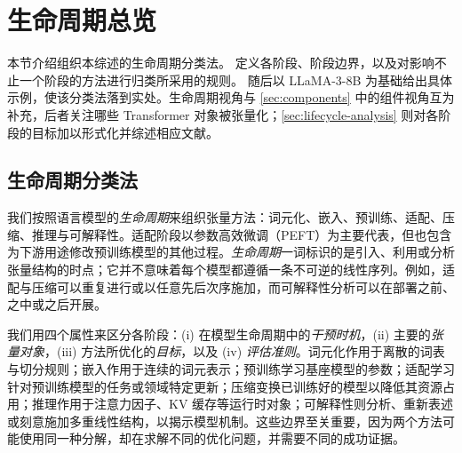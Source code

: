 \section{生命周期总览}
\label{sec:lifecycle-overview}

本节介绍组织本综述的生命周期分类法。 定义各阶段、阶段边界，以及对影响不止一个阶段的方法进行归类所采用的规则。 随后以 LLaMA-3-8B 为基础给出具体示例，使该分类法落到实处。生命周期视角与 \cref{sec:components} 中的组件视角互为补充，后者关注哪些 Transformer 对象被张量化；\cref{sec:lifecycle-analysis} 则对各阶段的目标加以形式化并综述相应文献。

\subsection{生命周期分类法}
\label{subsec:taxonomy}

我们按照语言模型的\emph{生命周期}来组织张量方法：词元化、嵌入、预训练、适配、压缩、推理与可解释性。适配阶段以参数高效微调（PEFT）为主要代表，但也包含为下游用途修改预训练模型的其他过程。\emph{生命周期}一词标识的是引入、利用或分析张量结构的时点；它并不意味着每个模型都遵循一条不可逆的线性序列。例如，适配与压缩可以重复进行或以任意先后次序施加，而可解释性分析可以在部署之前、之中或之后开展。

我们用四个属性来区分各阶段：(i) 在模型生命周期中的\emph{干预时机}，(ii) 主要的\emph{张量对象}，(iii) 方法所优化的\emph{目标}，以及 (iv) \emph{评估准则}。词元化作用于离散的词表与切分规则；嵌入作用于连续的词元表示；预训练学习基座模型的参数；适配学习针对预训练模型的任务或领域特定更新；压缩变换已训练好的模型以降低其资源占用；推理作用于注意力因子、KV 缓存等运行时对象；可解释性则分析、重新表述或刻意施加多重线性结构，以揭示模型机制。这些边界至关重要，因为两个方法可能使用同一种分解，却在求解不同的优化问题，并需要不同的成功证据。


